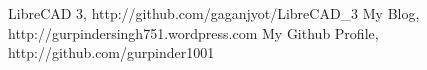 \begin{thebibliography}{9}
\bibitem{} LibreCAD 3, http://github.com/gaganjyot/LibreCAD\_3
\bibitem{} My Blog,
http://gurpindersingh751.wordpress.com
\bibitem{} My Github Profile,
http://github.com/gurpinder1001
\end{thebibliography}
